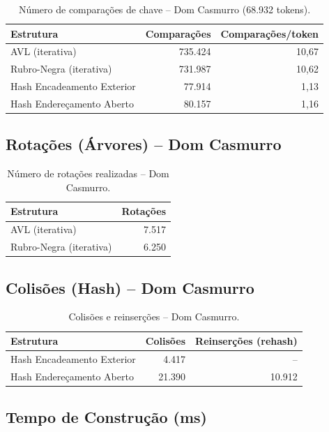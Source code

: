 \documentclass[12pt, a4paper]{article}
\begin{document}
\begin{table}[H]
\centering
\caption{Número de comparações de chave -- Dom Casmurro (68.932 tokens).}
\begin{tabular}{lrr}
\toprule
\textbf{Estrutura} & \textbf{Comparações} & \textbf{Comparações/token} \\
\midrule
AVL (iterativa)            & 735.424 & 10,67 \\
Rubro-Negra (iterativa)    & 731.987 & 10,62 \\
Hash Encadeamento Exterior & 77.914  & 1,13  \\
Hash Endereçamento Aberto  & 80.157  & 1,16  \\
\bottomrule
\end{tabular}
\end{table}

\subsection{Rotações (Árvores) -- Dom Casmurro}

\begin{table}[H]
\centering
\caption{Número de rotações realizadas -- Dom Casmurro.}
\begin{tabular}{lr}
\toprule
\textbf{Estrutura} & \textbf{Rotações} \\
\midrule
AVL (iterativa)         & 7.517 \\
Rubro-Negra (iterativa) & 6.250 \\
\bottomrule
\end{tabular}
\end{table}

\subsection{Colisões (Hash) -- Dom Casmurro}

\begin{table}[H]
\centering
\caption{Colisões e reinserções -- Dom Casmurro.}
\begin{tabular}{lrr}
\toprule
\textbf{Estrutura} & \textbf{Colisões} & \textbf{Reinserções (rehash)} \\
\midrule
Hash Encadeamento Exterior & 4.417  & --     \\
Hash Endereçamento Aberto  & 21.390 & 10.912 \\
\bottomrule
\end{tabular}
\end{table}

\subsection{Tempo de Construção (ms)}
\end{document}
